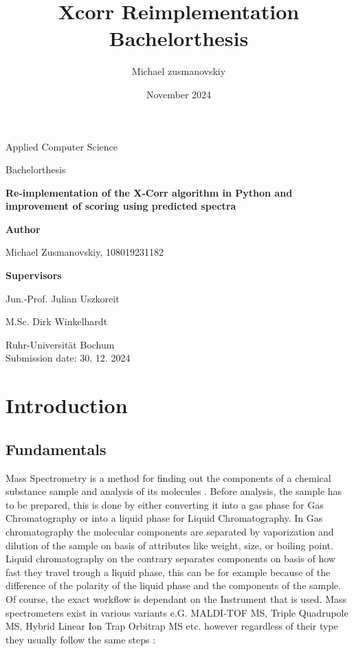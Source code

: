 \documentclass[12pt]{article}
\title{Xcorr Reimplementation Bachelorthesis}
\author{Michael zusmanovskiy}
\date{November 2024}
\begin{document}
\begin{titlepage}
    \begin{center}
        \LARGE
        Applied Computer Science

        \vspace{1cm}
        
        \LARGE
        Bachelorthesis

        \vspace{1cm}
            
        \LARGE
        \textbf{Re-implementation of the X-Corr algorithm in Python and improvement of scoring using predicted spectra}
            
        \vspace{1cm}

        \LARGE
        \textbf{Author}
        
        Michael Zusmanovskiy, 108019231182
        
        \vspace{1cm}
        
        \LARGE
        \textbf{Supervisors}
        
        Jun.-Prof. Julian Uszkoreit
        
        M.Sc. Dirk Winkelhardt
            
        \vfill
            
        \Large
        Ruhr-Universität Bochum\\
        
        Submission date: 30. 12. 2024
            
    \end{center}
\end{titlepage}


\section{Introduction}
\subsection{Fundamentals}
Mass Spectrometry is a method for finding out the components of a chemical substance sample and analysis of its molecules \cite{mass-specrometer}. Before analysis, the sample has to be prepared, this is done by either converting it into a gas phase for Gas Chromatography or into a liquid phase for Liquid Chromatography. In Gas chromatography the molecular components are separated by vaporization and dilution of the sample on basis of attributes like weight, size, or boiling point. Liquid chromatography on the contrary separates components on basis of how fast they travel trough a liquid phase, this can be for example because of the difference of the polarity of the liquid phase and the components of the sample. Of course, the exact workflow is dependant on the Instrument that is used. Mass spectrometers exist in various variants e.G. MALDI-TOF MS, Triple Quadrupole MS, Hybrid Linear Ion Trap Orbitrap MS etc.  \cite{mass-specrometer-types} however regardless of their type they usually follow the same steps \cite{mass-specrometer, what-is-mass-spectrometry}: 
\end{document}

